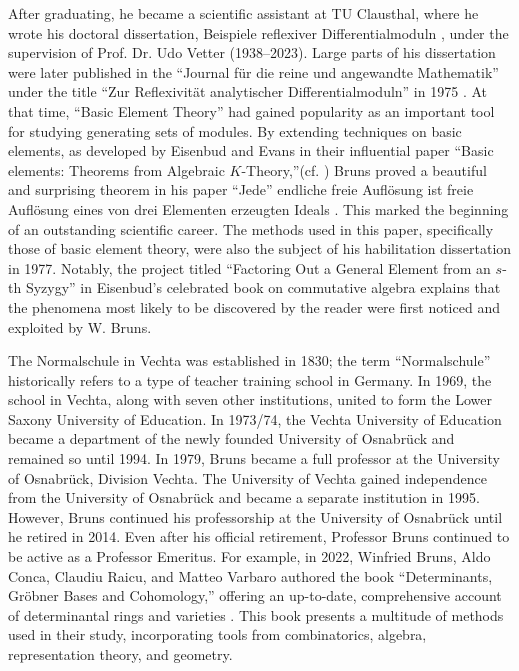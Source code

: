 \documentclass[10pt]{amsart}
\begin{document}
	After graduating, he became a scientific assistant at TU Clausthal, where he wrote his doctoral dissertation, Beispiele reflexiver Differentialmoduln \cite{Bruns1972}, under the supervision of Prof. Dr. Udo Vetter (1938--2023). Large parts of his dissertation were later published in the ``Journal f\"{u}r die reine und angewandte Mathematik'' under the title ``Zur Reflexivit\"{a}t analytischer Differentialmoduln'' in 1975 \cite{Bruns1975}. At that time, ``Basic Element Theory'' had gained popularity as an important tool for studying generating sets of modules. By extending techniques on basic elements, as developed by Eisenbud and Evans in their influential paper ``Basic elements: Theorems from Algebraic $K$-Theory,''(cf. \cite{EisenbudEvans1972}) Bruns proved a beautiful and surprising theorem in his paper ``Jede'' endliche freie Aufl\"{o}sung ist freie Aufl\"{o}sung eines von drei Elementen erzeugten Ideals \cite{Bruns1976}. This marked the beginning of an outstanding scientific career. The methods used in this paper, specifically those of basic element theory, were also the subject of his habilitation dissertation in 1977. Notably, the project titled ``Factoring Out a General Element from an $s$-th Syzygy'' in Eisenbud's celebrated book on commutative algebra \cite{Eisenbud1995} explains that the phenomena most likely to be discovered by the reader were first noticed and exploited by W. Bruns.
	
	The Normalschule in Vechta was established in 1830; the term ``Normalschule'' historically refers to a type of teacher training school in Germany. In 1969, the school in Vechta, along with seven other institutions, united to form the Lower Saxony University of Education. In 1973/74, the Vechta University of Education became a department of the newly founded University of Osnabr\"{u}ck and remained so until 1994. In 1979, Bruns became a full professor at the University of Osnabr\"{u}ck, Division Vechta. The University of Vechta gained independence from the University of Osnabr\"{u}ck and became a separate institution in 1995. However, Bruns continued his professorship at the University of Osnabr\"{u}ck until he retired in 2014. Even after his official retirement, Professor Bruns continued to be active as a Professor Emeritus. For example, in 2022, Winfried Bruns, Aldo Conca, Claudiu Raicu, and Matteo Varbaro authored the book ``Determinants, Gr\"{o}bner Bases and Cohomology,'' offering an up-to-date, comprehensive account of determinantal rings and varieties \cite{BCRV2022}. This book presents a multitude of methods used in their study, incorporating tools from combinatorics, algebra, representation theory, and geometry.
	
\end{document}
